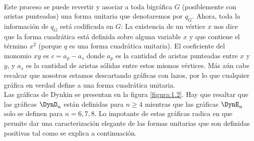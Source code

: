 \paragraph*{}
Este proceso se puede revertir y asociar a toda bigráfica $G$ (posiblemente con aristas punteadas) una forma unitaria que denotaremos por \textbf{$q_{G}$}. Ahora, toda la información de $q_{G}$ está codificada en $G$: La existencia de un vértice $x$ nos dice que la forma cuadrática está definida sobre alguna variable $x$ y que contiene el término $x^{2}$ (porque $q$ es una forma cuadrática unitaria). El coeficiente del monomio $xy$ es $c = a_{p} - a_{s}$ donde $a_{p}$ es la cantidad de aristas punteadas entre $x$ y $y$, y $a_{s}$ es la cantidad de aristas sólidas entre estos mismos vértices. Más aún cabe recalcar que nosotros estamos descartando gráficas con lazos, por lo que cualquier gráfica en verdad define a una forma cuadrática unitaria.\\
Las gráficas de Dynkin se presentan en la figura \ref{figura:1.2}. Hay que resaltar que las gráficas $\DynD_{n}$ están definidas para $n \geq 4$ mientras que las gráficas $\DynE_{n}$ solo se definen para $n = 6, 7, 8$. Lo impotante de estas gráficas radica en que permite dar una caracterización elegante de las formas unitarias que son definidas positivas tal como se explica a continuación.

